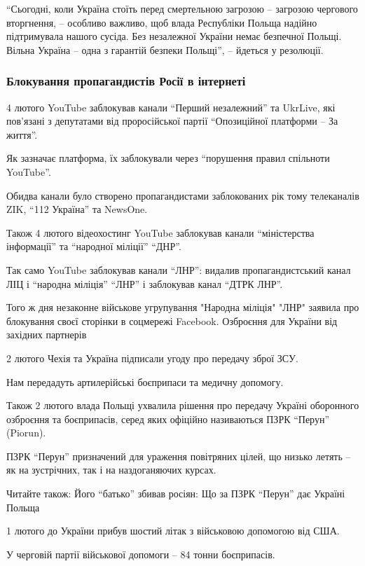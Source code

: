\enquote{Сьогодні, коли Україна стоїть перед смертельною загрозою – загрозою чергового
вторгнення, – особливо важливо, щоб влада Республіки Польща надійно
підтримувала нашого сусіда. Без незалежної України немає безпечної Польщі.
Вільна Україна – одна з гарантій безпеки Польщі}, – йдеться у резолюції.

\subsubsection{Блокування пропагандистів Росії в інтернеті}

4 лютого YouTube заблокував канали \enquote{Перший незалежний} та UkrLive, які
пов'язані з депутатами від проросійської партії \enquote{Опозиційної платформи
– За життя}.

Як зазначає платформа, їх заблокували через \enquote{порушення правил спільноти
YouTube}.

Обидва канали було створено пропагандистами заблокованих рік тому телеканалів
ZIK, \enquote{112 Україна} та NewsOne.

Також 4 лютого відеохостинг YouTube заблокував канали \enquote{міністерства
інформації} та \enquote{народної міліції} \enquote{ДНР}.

Так само YouTube заблокував канали \enquote{ЛНР}: видалив пропагандистський
канал ЛІЦ і \enquote{народна міліція} \enquote{ЛНР} і заблокував канал
\enquote{ДТРК ЛНР}.

Того ж дня незаконне військове угрупування "Народна міліція" "ЛНР" заявила про
блокування своєї сторінки в соцмережі Facebook.  Озброєння для України від
західних партнерів

2 лютого Чехія та Україна підписали угоду про передачу зброї ЗСУ.

Нам передадуть артилерійські боєприпаси та медичну допомогу.

Також 2 лютого влада Польщі ухвалила рішення про передачу Україні оборонного
озброєння та боєприпасів, серед яких офіційно називаються ПЗРК \enquote{Перун}
(Piorun).

ПЗРК \enquote{Перун} призначений для ураження повітряних цілей, що низько
летять – як на зустрічних, так і на наздоганяючих курсах.

Читайте також: Його \enquote{батько} збивав росіян: Що за ПЗРК \enquote{Перун}
дає Україні Польща

1 лютого до України прибув шостий літак з військовою допомогою від США.

У черговій партії військової допомоги – 84 тонни боєприпасів.

